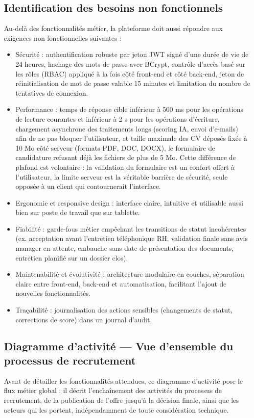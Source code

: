 \subsection{Identification des besoins non fonctionnels}
\label{sec_2_2_3}
Au-delà des fonctionnalités métier, la plateforme doit aussi répondre aux exigences non fonctionnelles suivantes :

\begin{itemize}
\item Sécurité : authentification robuste par jeton JWT signé d’une durée de vie de 24 heures, hachage des mots de passe avec BCrypt, contrôle d’accès basé sur les rôles (RBAC) appliqué à la fois côté front-end et côté back-end, jeton de réinitialisation de mot de passe valable 15 minutes et limitation du nombre de tentatives de connexion.
\item Performance : temps de réponse cible inférieur à 500 ms pour les opérations de lecture courantes et inférieur à 2 s pour les opérations d’écriture, chargement asynchrone des traitements longs (scoring IA, envoi d’e-mails) afin de ne pas bloquer l’utilisateur, et taille maximale des CV déposés fixée à 10 Mo côté serveur (formats PDF, DOC, DOCX), le formulaire de candidature refusant déjà les fichiers de plus de 5 Mo. Cette différence de plafond est volontaire : la validation du formulaire est un confort offert à l’utilisateur, la limite serveur est la véritable barrière de sécurité, seule opposée à un client qui contournerait l’interface.
\item Ergonomie et responsive design : interface claire, intuitive et utilisable aussi bien sur poste de travail que sur tablette.
\item Fiabilité : garde-fous métier empêchant les transitions de statut incohérentes (ex. acceptation avant l’entretien téléphonique RH, validation finale sans avis manager en attente, embauche sans date de présentation des documents, entretien planifié sur un dossier clos).
\item Maintenabilité et évolutivité : architecture modulaire en couches, séparation claire entre front-end, back-end et automatisation, facilitant l’ajout de nouvelles fonctionnalités.
\item Traçabilité : journalisation des actions sensibles (changements de statut, corrections de score) dans un journal d’audit.
\end{itemize}

\subsection{Diagramme d’activité — Vue d’ensemble du processus de recrutement}
\label{sec_2_2_4}
Avant de détailler les fonctionnalités attendues, ce diagramme d’activité pose le flux métier global : il décrit l’enchaînement des activités du processus de recrutement, de la publication de l’offre jusqu’à la décision finale, ainsi que les acteurs qui les portent, indépendamment de toute considération technique.

